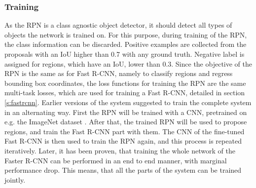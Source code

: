 \subsubsection{Training}
As the RPN is a class agnostic object detector, it should detect all types of objects the network is trained on. For this purpose, during training of the RPN, the class information can be discarded. Positive examples are collected from the proposals with an IoU higher than 0.7 with any ground truth. Negative label is assigned for regions, which have an IoU, lower than 0.3.
\bigbreak
Since the objective of the RPN is the same as for Fast R-CNN, namely to classify regions and regress bounding box coordinates, the loss functions for training the RPN are the same multi-task losses, which are used for training a Fast R-CNN, detailed in section \ref{s:fastrcnn}.
\bigbreak
Earlier versions of the system suggested to train the complete system in an alternating way. First the RPN will be trained with a CNN, pretrained on e.g. the ImageNet dataset \cite{imagenet_cvpr09}. After that, the trained RPN will be used to propose regions, and train the Fast R-CNN part with them. The CNN of the fine-tuned Fast R-CNN is then used to train the RPN again, and this process is repeated iteratively. Later, it has been proven, that training the whole network of the Faster R-CNN can be performed in an end to end manner, with marginal performance drop. This means, that all the parts of the system can be trained jointly.